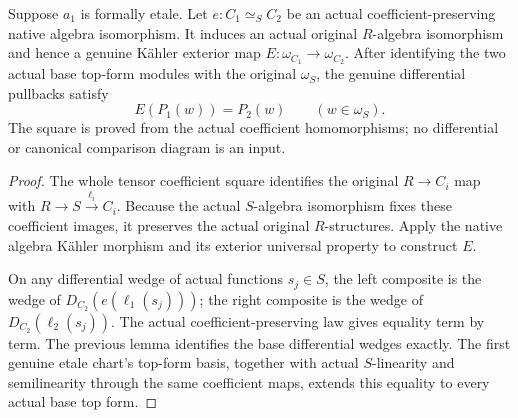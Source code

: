 \begin{theorem}
\label{thm:kn-nadel-cross-chart-exterior-square}
\leanok
Suppose $a_1$ is formally etale.  Let $e:C_1\simeq_S C_2$ be an actual coefficient-preserving native
algebra isomorphism.  It induces an actual original $R$-algebra
isomorphism and hence a genuine K\"ahler exterior map
$E:\omega_{C_1}\to\omega_{C_2}$.  After identifying the two actual
base top-form modules with the original $\omega_S$, the genuine
differential pullbacks satisfy
\[
 E(P_1(w))=P_2(w)\qquad(w\in\omega_S).
\]
The square is proved from the actual coefficient homomorphisms;
no differential or canonical comparison diagram is an input.
\end{theorem}
\begin{proof}
The whole tensor coefficient square identifies the original
$R\to C_i$ map with $R\to S\xrightarrow{\ell_i} C_i$.
Because the actual $S$-algebra isomorphism fixes these coefficient
images, it preserves the actual original $R$-structures.  Apply
the native algebra K\"ahler morphism and its exterior universal
property to construct $E$.

On any differential wedge of actual functions $s_j\in S$, the
left composite is the wedge of $D_{C_2}(e(\ell_1(s_j)))$; the
right composite is the wedge of $D_{C_2}(\ell_2(s_j))$.  The actual
coefficient-preserving law gives equality term by term.  The
previous lemma identifies the base differential wedges exactly.
The first genuine etale chart's top-form basis, together with
actual $S$-linearity and semilinearity through the same coefficient
maps, extends this equality to every actual base top form.
\end{proof}

